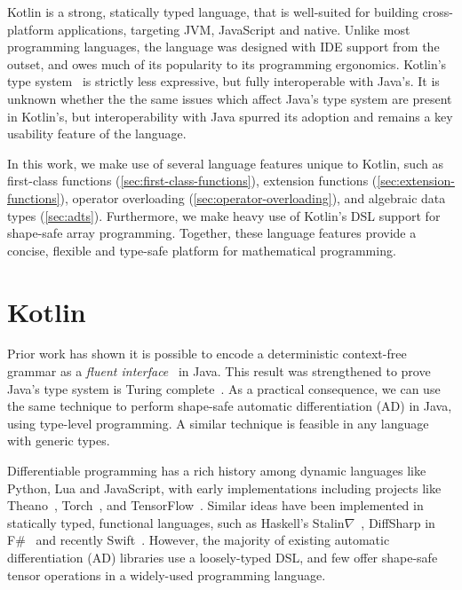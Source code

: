 \documentclass[12pt,initial,twoside,maitrise]{dms}
\numberwithin{equation}{section}
\numberwithin{table}{chapter}
\numberwithin{figure}{chapter}
\begin{document}
Kotlin is a strong, statically typed language, that is well-suited for building cross-platform applications, targeting JVM, JavaScript and native. Unlike most programming languages, the language was designed with IDE support from the outset, and owes much of its popularity to its programming ergonomics. Kotlin's type system~\citep{tate2013mixed} is strictly less expressive, but fully interoperable with Java's. It is unknown whether the the same issues which affect Java's type system are present in Kotlin's, but interoperability with Java spurred its adoption and remains a key usability feature of the language.

In this work, we make use of several language features unique to Kotlin, such as first-class functions (\autoref{sec:first-class-functions}), extension functions (\autoref{sec:extension-functions}), operator overloading (\autoref{sec:operator-overloading}), and algebraic data types (\autoref{sec:adts}). Furthermore, we make heavy use of Kotlin's DSL support for shape-safe array programming. Together, these language features provide a concise, flexible and type-safe platform for mathematical programming.

\section{Kotlin\textorpdfstring{$\nabla$}}\label{sec:kotlingrad}

Prior work has shown it is possible to encode a deterministic context-free grammar as a \textit{fluent interface}~\citep{gil2016formal} in Java. This result was strengthened to prove Java's type system is Turing complete~\citep{Grigore:2017:JGT:3009837.3009871}. As a practical consequence, we can use the same technique to perform shape-safe automatic differentiation (AD) in Java, using type-level programming. A similar technique is feasible in any language with generic types.

Differentiable programming has a rich history among dynamic languages like Python, Lua and JavaScript, with early implementations including projects like Theano~\citep{theano}, Torch~\citep{collobert2002torch}, and TensorFlow~\citep{abadi2016tensorflow}. Similar ideas have been implemented in statically typed, functional languages, such as Haskell's Stalin$\nabla$~\citep{pearlmutter2008using}, DiffSharp in F\#~\citep{baydin-diffsharp} and recently Swift~\citep{swift}. However, the majority of existing automatic differentiation (AD) libraries use a loosely-typed DSL, and few offer shape-safe tensor operations in a widely-used programming language.
\end{document}

